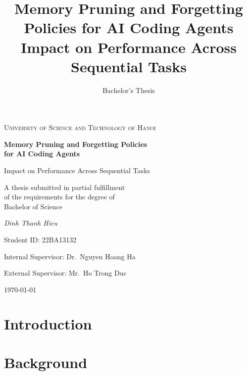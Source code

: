 \documentclass[11pt,oneside]{book}
\title{Memory Pruning and Forgetting Policies for AI Coding Agents\\
\large Impact on Performance Across Sequential Tasks}
\author{}
\date{Bachelor's Thesis}
\begin{document}
\frontmatter
\begin{titlepage}
  \centering
  {\large\scshape University of Science and Technology of Hanoi\par}
  \vspace*{2cm}
  {\LARGE\bfseries Memory Pruning and Forgetting Policies\\
   for AI Coding Agents\par}
  \vspace{0.6em}
  {\large Impact on Performance Across Sequential Tasks\par}
  \vspace{2.2cm}
  {\large A thesis submitted in partial fulfillment\\
   of the requirements for the degree of\\
   Bachelor of Science\par}
  \vspace{2cm}
  {\large\itshape Dinh Thanh Hieu\par}
  \vspace{0.2em}
  {\normalsize Student ID: 22BA13132\par}
  \vspace{1.2em}
  {\normalsize Internal Supervisor: Dr.\ Nguyen Hoang Ha\par}
  \vspace{0.2em}
  {\normalsize External Supervisor: Mr.\ Ho Trong Duc\par}
  \vfill
  {\normalsize \today\par}
\end{titlepage}


\clearpage
\tableofcontents\clearpage
\listoffigures\clearpage
\listoftables\clearpage

\mainmatter
\chapter{Introduction}\label{ch:intro}





\chapter{Background}\label{ch:background}




\end{document}
